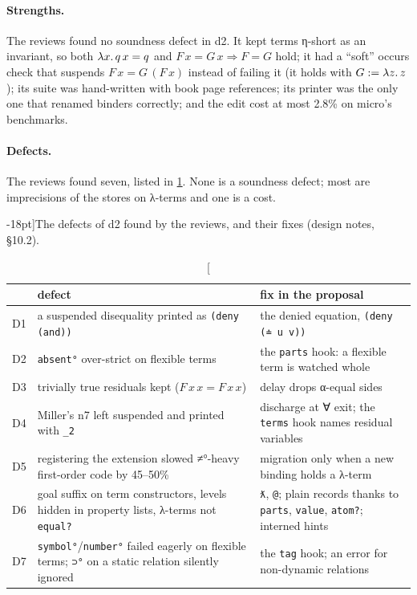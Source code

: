 \paragraph{Strengths.} The reviews found no soundness defect in d2. It kept terms η-short as an
invariant, so both $\lambda x.\,q\,x=q$ and $F\,x=G\,x\Rightarrow F=G$ hold; it had a \enquote{soft}
occurs check that suspends $F\,x=G\,(F\,x)$ instead of failing it (it holds with $G:=\lambda z.\,z$); its
suite was hand-written with book page references; its printer was the only one that renamed binders
correctly; and the edit cost at most 2.8\% on micro's benchmarks.

\paragraph{Defects.} The reviews found seven, listed in \cref{tab:design-d2}. None is a soundness
defect; most are imprecisions of the stores on λ-terms and one is a cost.

\begin{table}[ht]
\footnotesize
\caption[][-18pt]{The defects of d2 found by the reviews, and their fixes (design notes, §10.2).}
\label{tab:design-d2}
\renewcommand{\arraystretch}{1.2}
\begin{tabularx}{\linewidth}{@{}l>{\raggedright\arraybackslash}X>{\raggedright\arraybackslash}X@{}}
\toprule
& defect & fix in the proposal\\
\midrule
D1 & a suspended disequality printed as \texttt{(deny (and))} & the denied equation, \texttt{(deny (≐ u v))}\\
D2 & \texttt{absent°} over-strict on flexible terms & the \texttt{parts} hook: a flexible term is watched whole\\
D3 & trivially true residuals kept ($F\,x\,x=F\,x\,x$) & delay drops α-equal sides\\
D4 & Miller's n7 left suspended and printed with \texttt{\_2} & discharge at ∀ exit; the \texttt{terms} hook names residual variables\\
D5 & registering the extension slowed ≠°-heavy first-order code by 45--50\% & migration only when a new binding holds a λ-term\\
D6 & goal suffix on term constructors, levels hidden in property lists, λ-terms not \texttt{equal?} & \texttt{ƛ}, \texttt{@}; plain records thanks to \texttt{parts}, \texttt{value}, \texttt{atom?}; interned hints\\
D7 & \texttt{symbol°}/\texttt{number°} failed eagerly on flexible terms; \texttt{⊃°} on a static relation silently ignored & the \texttt{tag} hook; an error for non-dynamic relations\\
\bottomrule
\end{tabularx}\par\vspace{28pt}%
\end{table}

